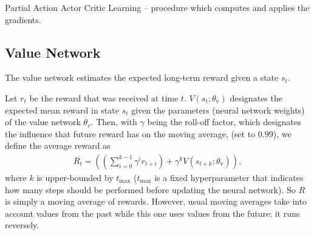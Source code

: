 \documentclass[sigconf]{acmart}
\makeatletter
\newcommand\givenbase[1][]{\:#1\lvert\:}
\let\given\givenbase
\newcommand{\StateIndent}[1][3]{%
  \setlength\@tempdima{\algorithmicindent}%
  \Statex\hskip\dimexpr#1\@tempdima\relax}
\makeatother
\begin{document}
\begin{algorithm}
\caption{Partial Action Actor Critic Learning -- procedure which computes and applies the gradients.}
\label{alg:grad}
\end{algorithm}

\subsection{Value Network}
\label{subsec:genericvalue}

The value network estimates the expected long-term reward given a state $s_t$.

Let $r_t$ be the reward that was received at time $t$. $V(s_t; \theta_\text{v})$ designates the expected mean reward in state $s_t$ given the parameters (neural network weights) of the value network $\theta_v$. Then, with $\gamma$ being the roll-off factor, which designates the influence that future reward has on the moving average, (set to $0.99$), we define the average reward as 
\begin{align*}
R_t = \left(\left(\sum_{i=0}^{k-1} \gamma^ir_{t+i}\right) + \gamma^k V(s_{t+k}; \theta_\text{v})\right),
\end{align*}
where $k$ is upper-bounded by $t_\text{max}$ ($t_\text{max}$ is a fixed hyperparameter that indicates how many steps should be performed before updating the neural network). So $R$ is simply a moving average of rewards. However, usual moving averages take into account values from the past while this one uses values from the future; it runs reversely. 
\end{document}
